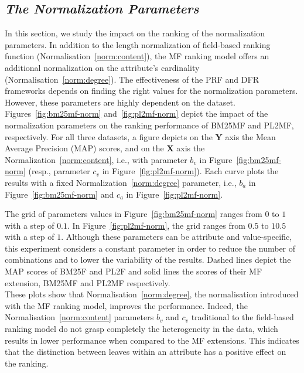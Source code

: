 %

\subsection{\emph{The Normalization Parameters}}
\label{sec:norm-exp}

In this section, we study the impact on the ranking of the normalization parameters. In addition to the length normalization of field-based ranking function (Normalisation~\ref{norm:content}), the MF ranking model offers an additional normalization on the attribute's cardinality (Normalisation~\ref{norm:degree}). The effectiveness of the PRF and DFR frameworks depends on finding the right values for the normalization parameters. However, these parameters are highly dependent on the dataset.\\

Figures~\ref{fig:bm25mf-norm} and~\ref{fig:pl2mf-norm} depict the impact of the normalization parameters on the ranking performance of BM25MF and PL2MF, respectively. For all three datasets, a figure depicts on the \textbf{Y} axis the Mean Average Precision (MAP) scores, and on the \textbf{X} axis the Normalization~\ref{norm:content}, i.e., with parameter $b_v$ in Figure~\ref{fig:bm25mf-norm} (resp., parameter $c_v$ in Figure~\ref{fig:pl2mf-norm}). Each curve plots the results with a fixed Normalization~\ref{norm:degree} parameter, i.e., $b_a$ in Figure~\ref{fig:bm25mf-norm} and $c_a$ in Figure~\ref{fig:pl2mf-norm}.

The grid of parameters values in Figure~\ref{fig:bm25mf-norm} ranges from $0$ to $1$ with a step of $0.1$. In Figure~\ref{fig:pl2mf-norm}, the grid ranges from $0.5$ to $10.5$ with a step of $1$. Although these parameters can be attribute and value-specific, this experiment considers a constant parameter in order to reduce the number of combinations and to lower the variability of the results. Dashed lines depict the MAP scores of BM25F and PL2F and solid lines the scores of their MF extension, BM25MF and PL2MF respectively.\\

These plots show that Normalisation~\ref{norm:degree}, the normalisation introduced with the MF ranking model, improves the performance. Indeed, the Normalisation~\ref{norm:content} parameters $b_v$ and $c_v$ traditional to the field-based ranking model do not grasp completely the heterogeneity in the data, which results in lower performance when compared to the MF extensions. This indicates that the distinction between leaves within an attribute has a positive effect on the ranking.

